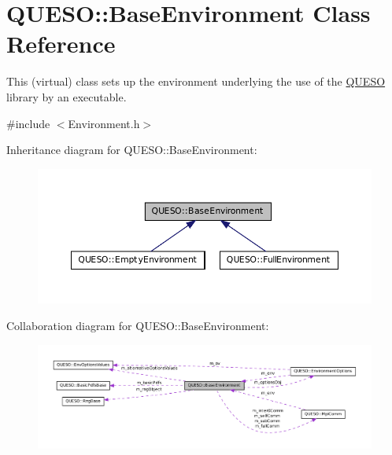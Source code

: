 \hypertarget{class_q_u_e_s_o_1_1_base_environment}{\section{Q\-U\-E\-S\-O\-:\-:Base\-Environment Class Reference}
\label{class_q_u_e_s_o_1_1_base_environment}
}


This (virtual) class sets up the environment underlying the use of the \hyperlink{namespace_q_u_e_s_o}{Q\-U\-E\-S\-O} library by an executable.  




{\ttfamily \#include $<$Environment.\-h$>$}



Inheritance diagram for Q\-U\-E\-S\-O\-:\-:Base\-Environment\-:
\nopagebreak
\begin{figure}[H]
\begin{center}
\leavevmode
\includegraphics[width=350pt]{class_q_u_e_s_o_1_1_base_environment__inherit__graph}
\end{center}
\end{figure}


Collaboration diagram for Q\-U\-E\-S\-O\-:\-:Base\-Environment\-:
\nopagebreak
\begin{figure}[H]
\begin{center}
\leavevmode
\includegraphics[width=350pt]{class_q_u_e_s_o_1_1_base_environment__coll__graph}
\end{center}
\end{figure}
